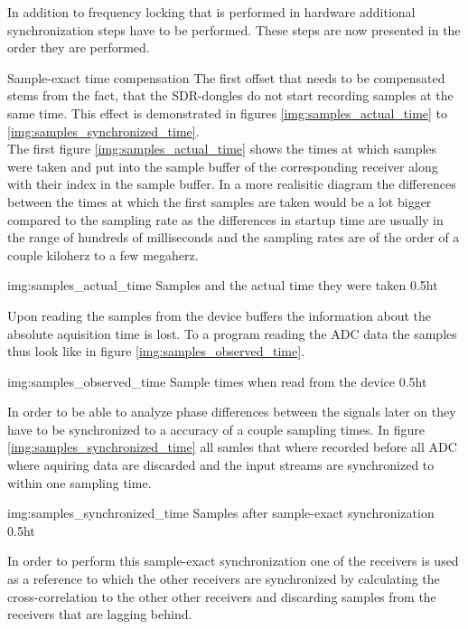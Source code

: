 In addition to frequency locking that is performed in
hardware additional synchronization steps have to
be performed. These steps are now presented in the
order they are performed. \\

\begin{subchapter}{Sample-exact time compensation}
  The first offset that needs to be compensated stems
  from the fact, that the SDR-dongles do not start
  recording samples at the same time.
  This effect is demonstrated in figures
  \ref{img:samples_actual_time} to \ref{img:samples_synchronized_time}. \\

  The first figure \ref{img:samples_actual_time} shows the
  times at which samples were taken and put into the
  sample buffer of the corresponding receiver along
  with their index in the sample buffer.
  In a more realisitic diagram the differences between the
  times at which the first samples are taken would be
  a lot bigger compared to the sampling rate as the
  differences in startup time are usually in the range
  of hundreds of milliseconds and the sampling rates are
  of the order of a couple kiloherz to a few megaherz.

               {img:samples_actual_time}
               {Samples and the actual time they were taken}
               {0.5}{ht}

  Upon reading the samples from the device buffers
  the information about the absolute aquisition time is
  lost. To a program reading the ADC data the
  samples thus look like in figure \ref{img:samples_observed_time}.

               {img:samples_observed_time}
               {Sample times when read from the device}
               {0.5}{ht}

  In order to be able to analyze phase differences between
  the signals later on they have to be synchronized to
  a accuracy of a couple sampling times.
  In figure \ref{img:samples_synchronized_time} all
  samles that where recorded before all ADC where aquiring
  data are discarded and the input streams are
  synchronized to within one sampling time.

               {img:samples_synchronized_time}
               {Samples after sample-exact synchronization}
               {0.5}{ht}

  In order to perform this sample-exact synchronization
  one of the receivers is used as a reference to which
  the other receivers are synchronized by calculating the
  cross-correlation to the other other receivers and discarding
  samples from the receivers that are lagging behind. \\


\end{subchapter}
